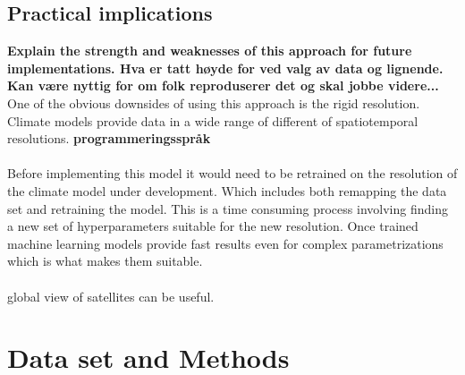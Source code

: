 \subsection{Practical implications} \label{sec:practical_implications}
\textbf{Explain the strength and weaknesses of this approach for future implementations. Hva er tatt høyde for ved valg av data og lignende. Kan være nyttig for om folk reproduserer det og skal jobbe videre...}
One of the obvious downsides of using this approach is the rigid resolution. 
Climate models provide data in a wide range of different of spatiotemporal resolutions. \textbf{programmeringsspråk}
\\ \\ 
Before implementing this model it would need to be retrained on the resolution of the climate model under development. Which includes both remapping the data set and retraining the model. This is a time consuming process involving finding a new set of hyperparameters suitable for the new resolution. Once trained machine learning models provide fast results even for complex parametrizations which is what makes them suitable. \\ \\ global view of satellites can be useful. 

\section{Data set and Methods}
